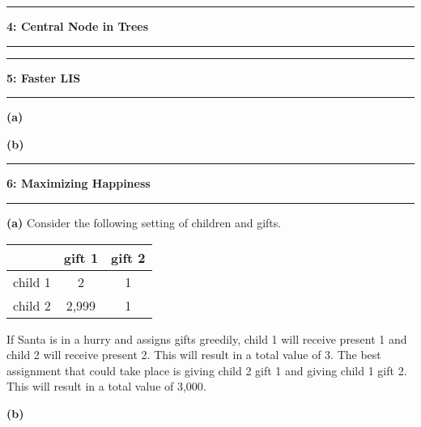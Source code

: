 \documentclass[11pt]{article}
\newcommand\question[2]{\vspace{.25in}\hrule\textbf{#1: #2}\vspace{.5em}\hrule\vspace{.10in}}
\renewcommand\part[1]{\vspace{.10in}\textbf{(#1)}}
\begin{document}
\question{4}{Central Node in Trees}

\question{5}{Faster LIS}

\part{a}

\part{b}

\question{6}{Maximizing Happiness}

\part{a} Consider the following setting of children and gifts.

\begin{table}[H]
\centering
{\renewcommand{\arraystretch}{1.2}%
\begin{tabular}{| c | c | c |}
\hline
& gift 1 & gift 2 \\ \hline
child 1 & 2& 1 \\ \hline
child 2 & 2,999& 1\\ \hline
\end{tabular}}
\end{table}

If Santa is in a hurry and assigns gifts greedily, child 1 will receive present 1 and child 2 will receive present 2. This will result in a total value of 3. The best assignment that could take place is giving child 2 gift 1 and giving child 1 gift 2. This will result in a total value of 3,000. 

\part{b}
\end{document}
